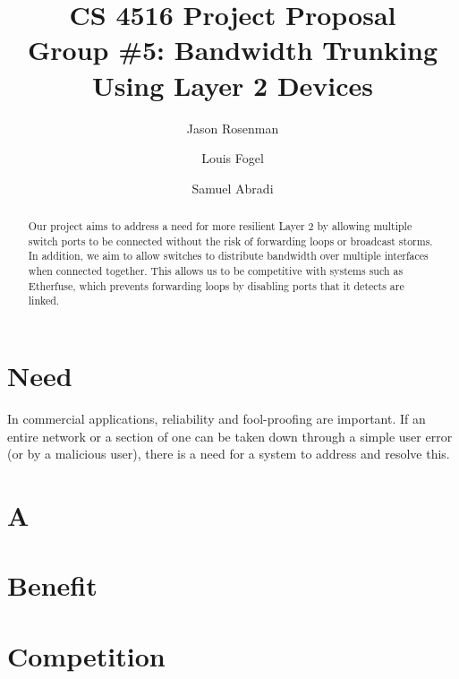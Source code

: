 \documentclass[11pt,titlepage]{article}
\title{CS 4516 Project Proposal\\Group \#5: Bandwidth Trunking Using Layer 2 Devices}
\author{Jason Rosenman \and Louis Fogel \and Samuel Abradi}
\begin{document}
\maketitle
\begin{abstract}
	Our project aims to address a need for more resilient Layer 2 by allowing multiple switch ports to be connected without the risk of forwarding loops or broadcast storms.
	In addition, we aim to allow switches to distribute bandwidth over multiple interfaces when connected together.
	This allows us to be competitive with systems such as Etherfuse, which prevents forwarding loops by disabling ports that it detects are linked.
\end{abstract}
\section{Need}
	In commercial applications, reliability and fool-proofing are important.
	If an entire network or a section of one can be taken down through a simple user error (or by a malicious user), there is a need for a system to address and resolve this.
\section{A}
\section{Benefit}
\section{Competition}
\end{document}
